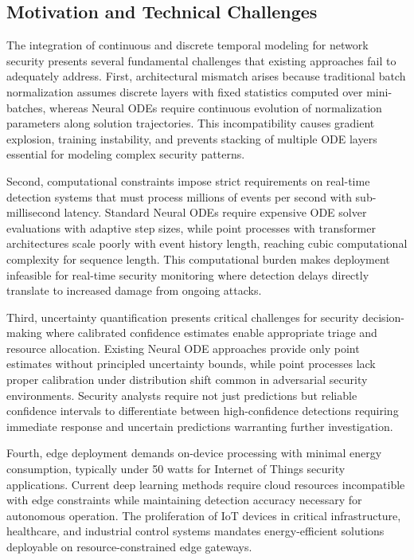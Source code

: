 \documentclass[10pt,journal,compsoc]{IEEEtran}
\begin{document}
\subsection{Motivation and Technical Challenges}

The integration of continuous and discrete temporal modeling for network security presents several fundamental challenges that existing approaches fail to adequately address. First, architectural mismatch arises because traditional batch normalization assumes discrete layers with fixed statistics computed over mini-batches, whereas Neural ODEs require continuous evolution of normalization parameters along solution trajectories. This incompatibility causes gradient explosion, training instability, and prevents stacking of multiple ODE layers essential for modeling complex security patterns.

Second, computational constraints impose strict requirements on real-time detection systems that must process millions of events per second with sub-millisecond latency. Standard Neural ODEs require expensive ODE solver evaluations with adaptive step sizes, while point processes with transformer architectures scale poorly with event history length, reaching cubic computational complexity for sequence length. This computational burden makes deployment infeasible for real-time security monitoring where detection delays directly translate to increased damage from ongoing attacks.

Third, uncertainty quantification presents critical challenges for security decision-making where calibrated confidence estimates enable appropriate triage and resource allocation. Existing Neural ODE approaches provide only point estimates without principled uncertainty bounds, while point processes lack proper calibration under distribution shift common in adversarial security environments. Security analysts require not just predictions but reliable confidence intervals to differentiate between high-confidence detections requiring immediate response and uncertain predictions warranting further investigation.

Fourth, edge deployment demands on-device processing with minimal energy consumption, typically under 50 watts for Internet of Things security applications. Current deep learning methods require cloud resources incompatible with edge constraints while maintaining detection accuracy necessary for autonomous operation. The proliferation of IoT devices in critical infrastructure, healthcare, and industrial control systems mandates energy-efficient solutions deployable on resource-constrained edge gateways.
\end{document}
